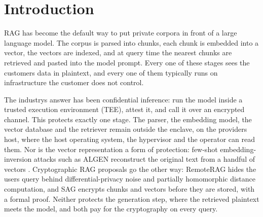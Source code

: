 \documentclass[letterpaper,twocolumn,10pt]{article}
\begin{document}
\begin{abstract}
\% at 7B--14B) because the cost is per kernel launch, not per FLOP; and an inference-only TEE deployment pays the same, so protecting the whole pipeline costs nothing over protecting the model call. The key broker signs every release and records the version of the sealed index, so the host can neither hand the node a key of its own nor roll the index back to a snapshot the tenant has retracted. The verifiers, policy engine and key-release protocol are 2.9 k lines of Python with no dependency beyond a cryptography library, small enough to analyse as a whole: a Tamarin model proves possession, freshness, session binding, release authenticity and answer authenticity, and it exposed two gaps on the way, a colluding operator\textquotesingle s own confidential GPU standing in for the attached one and the host substituting the index key in an unsigned release, whose fixes the system now runs; and the policy function is an executable Lean specification whose compiled binary agrees with the engine on every tested input.

\end{abstract}

\section{Introduction}\label{introduction}

RAG has become the default way to put private corpora in front of a large language model. The corpus is parsed into chunks, each chunk is embedded into a vector, the vectors are indexed, and at query time the nearest chunks are retrieved and pasted into the model prompt. Every one of these stages sees the customer\textquotesingle s data in plaintext, and every one of them typically runs on infrastructure the customer does not control.

The industry\textquotesingle s answer has been confidential inference: run the model inside a trusted execution environment (TEE), attest it, and call it over an encrypted channel. This protects exactly one stage. The parser, the embedding model, the vector database and the retriever remain outside the enclave, on the provider\textquotesingle s host, where the host operating system, the hypervisor and the operator can read them. Nor is the vector representation a form of protection: few-shot embedding-inversion attacks such as ALGEN reconstruct the original text from a handful of vectors \cite{chen2025algen}. Cryptographic RAG proposals go the other way: RemoteRAG \cite{cheng2025remoterag} hides the user\textquotesingle s query behind differential-privacy noise and partially homomorphic distance computation, and SAG \cite{zhou2025sag} encrypts chunks and vectors before they are stored, with a formal proof. Neither protects the generation step, where the retrieved plaintext meets the model, and both pay for the cryptography on every query.
\end{document}
